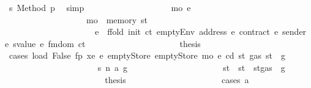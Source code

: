 \begin{isabellebody}
\ s{}\ Method\ p{}\ \isamarkupfalse%
\ simp\isanewline
\ \ \ \ \ \ \ \ \ \ \ \ \ \ \ \ \ \ \isamarkupfalse%
\ m\isactrlsub o\ e{\isacharprime}{\kern0pt}\isanewline
\ \ \ \ \ \ \ \ \ \ \ \ \ \ \ \ \ \ \ {\isachardoublequoteopen}m\isactrlsub o\ {\isacharequal}{\kern0pt}\ memory\ st{\isacharprime}{\kern0pt}{\isachardoublequoteclose}\isanewline
\ \ \ \ \ \ \ \ \ \ \ \ \ \ \ \ \ \ \ \ \ {\isachardoublequoteopen}e{\isacharprime}{\kern0pt}\ {\isacharequal}{\kern0pt}\ ffold\ {\isacharparenleft}{\kern0pt}init\ ct{\isacharparenright}{\kern0pt}\ {\isacharparenleft}{\kern0pt}emptyEnv\ {\isacharparenleft}{\kern0pt}address\ e{\isacharparenright}{\kern0pt}\ {\isacharparenleft}{\kern0pt}contract\ e{\isacharparenright}{\kern0pt}\ {\isacharparenleft}{\kern0pt}sender\ e{\isacharparenright}{\kern0pt}\ {\isacharparenleft}{\kern0pt}svalue\ e{\isacharparenright}{\kern0pt}{\isacharparenright}{\kern0pt}\ {\isacharparenleft}{\kern0pt}fmdom\ ct{\isacharparenright}{\kern0pt}{\isachardoublequoteclose}\isanewline
\ \ \ \ \ \ \ \ \ \ \ \ \ \ \ \ \ \ \isamarkupfalse%
\ \isamarkupfalse%
\ {\isacharquery}{\kern0pt}thesis\isanewline
\ \ \ \ \ \ \ \ \ \ \ \ \ \ \ \ \ \ \isamarkupfalse%
\ {\isacharparenleft}{\kern0pt}cases\ {\isachardoublequoteopen}load\ False\ fp\ xe\ e{\isacharprime}{\kern0pt}\ emptyStore\ emptyStore\ m\isactrlsub o\ e\ cd\ st{\isacharprime}{\kern0pt}\ {\isacharparenleft}{\kern0pt}gas\ st\ {\isacharminus}{\kern0pt}\ g{\isacharparenright}{\kern0pt}{\isachardoublequoteclose}{\isacharparenright}{\kern0pt}\isanewline
\ \ \ \ \ \ \ \ \ \ \ \ \ \ \ \ \ \ \ \ \isamarkupfalse%
\ s{}{\isacharcolon}{\kern0pt}\ {\isacharparenleft}{\kern0pt}n\ a\ g{\isacharprime}{\kern0pt}{\isacharparenright}{\kern0pt}\isanewline
\ \ \ \ \ \ \ \ \ \ \ \ \ \ \ \ \ \ \ \ \isamarkupfalse%
\ st{\isacharprime}{\kern0pt}{\isacharprime}{\kern0pt}\ \ {\isachardoublequoteopen}st{\isacharprime}{\kern0pt}{\isacharprime}{\kern0pt}\ {\isacharequal}{\kern0pt}\ st{\isacharprime}{\kern0pt}{\isasymlparr}gas\ {\isacharcolon}{\kern0pt}{\isacharequal}{\kern0pt}\ g{\isacharprime}{\kern0pt}{\isasymrparr}{\isachardoublequoteclose}\isanewline
\ \ \ \ \ \ \ \ \ \ \ \ \ \ \ \ \ \ \ \ \isamarkupfalse%
\ \isamarkupfalse%
\ {\isacharquery}{\kern0pt}thesis\isanewline
\ \ \ \ \ \ \ \ \ \ \ \ \ \ \ \ \ \ \ \ \isamarkupfalse%
\ {\isacharparenleft}{\kern0pt}cases\ a{\isacharparenright}{\kern0pt}\isanewline

\end{isabellebody}
